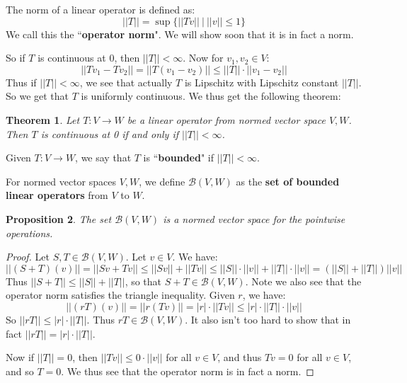 \documentclass[a4paper,12pt]{report}
\newcommand{\ms}[1]{\mathscr{#1}}
\newtheorem{theorem}{Theorem}[section]
\newtheorem{prop}[theorem]{Proposition}
\newenvironment{definition}[1][Definition.]{\begin{trivlist}
\item[\hskip \labelsep {\bfseries #1}]}{\end{trivlist}}
\begin{document}
	\begin{definition}
	The norm of a linear operator is defined as:
	\[ ||T|| = \sup \bigg\{ ||Tv|| ~\big|~ ||v|| \leq 1 \bigg\} \]
	We call this the ``\textbf{operator norm}". We will show soon that it is in fact a norm. 
	\end{definition}
	
	\noindent So if $T$ is continuous at 0, then $||T|| < \infty$. Now for $v_1, v_2 \in V$:
	\[ ||Tv_1 - Tv_2|| = ||T(v_1 - v_2)|| \leq ||T|| \cdot ||v_1 - v_2|| \]
	Thus if $||T|| < \infty$, we see that actually $T$ is Lipschitz with Lipschitz constant $||T||$. So we get that $T$ is uniformly continuous. We thus get the following theorem:
	
	\begin{theorem}
	Let $T : V \rightarrow W$ be a linear operator from normed vector space $V, W$. Then $T$ is continuous at 0 if and only if $||T|| < \infty$. 
	\end{theorem}
	
	\begin{definition}
	Given $T : V \rightarrow W$, we say that $T$ is ``\textbf{bounded}" if $||T|| < \infty$. 
	\end{definition}
	
	\begin{definition}
	For normed vector spaces $V, W$, we define $\ms{B}(V, W)$ as the \textbf{set of bounded linear operators} from $V$ to $W$.
	\end{definition}
	
	\begin{prop}
	The set $\ms{B}(V, W)$ is a normed vector space for the pointwise operations. 
	\end{prop}
	\begin{proof}
	Let $S, T \in \ms{B}(V, W)$. Let $v \in V$. We have:
	\[ ||(S + T)(v)|| = ||Sv + Tv|| \leq ||Sv|| + ||Tv|| \leq ||S|| \cdot ||v|| + ||T|| \cdot ||v|| = (||S|| + ||T||)||v|| \]
	Thus $||S + T|| \leq ||S|| + ||T||$, so that $S + T \in \ms{B}(V, W)$. Note we also see that the operator norm satisfies the triangle inequality. Given $r$, we have:
	\[ ||(rT)(v)|| = ||r(Tv)|| = |r|\cdot||Tv|| \leq |r| \cdot ||T|| \cdot ||v|| \]
	So $||rT|| \leq |r| \cdot ||T||$. Thus $rT \in \ms{B}(V, W)$. It also isn't too hard to show that in fact $||rT|| = |r| \cdot ||T||$. 
	
	Now if $||T|| = 0$, then $||Tv|| \leq 0 \cdot ||v||$ for all $v \in V$, and thus $Tv = 0$ for all $v \in V$, and so $T = 0$. We thus see that the operator norm is in fact a norm. 
	\end{proof}
	
\end{document}
